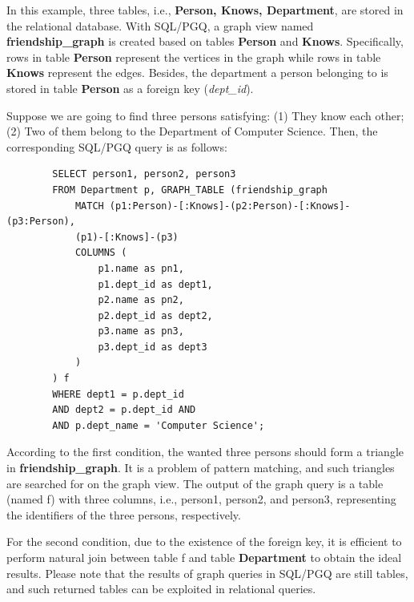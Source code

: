 \begin{example}
    \label{example:introduction:sqlpgq}
    In this example, three tables, i.e., \textbf{Person, Knows, Department}, are stored in the relational database.
    With SQL/PGQ, a graph view named \textbf{friendship\_graph} is created based on tables \textbf{Person} and \textbf{Knows}.
    Specifically, rows in table \textbf{Person} represent the vertices in the graph while rows in table \textbf{Knows} represent the edges.
    Besides, the department a person belonging to is stored in table \textbf{Person} as a foreign key (\textit{dept\_id}).

    Suppose we are going to find three persons satisfying: (1) They know each other; (2) Two of them belong to the Department of Computer Science.
    Then, the corresponding SQL/PGQ query is as follows:
    \begin{lstlisting}
        SELECT person1, person2, person3
        FROM Department p, GRAPH_TABLE (friendship_graph
            MATCH (p1:Person)-[:Knows]-(p2:Person)-[:Knows]-(p3:Person),
            (p1)-[:Knows]-(p3)
            COLUMNS (
                p1.name as pn1,
                p1.dept_id as dept1,
                p2.name as pn2,
                p2.dept_id as dept2,
                p3.name as pn3,
                p3.dept_id as dept3
            )
        ) f
        WHERE dept1 = p.dept_id
        AND dept2 = p.dept_id AND
        AND p.dept_name = 'Computer Science';
    \end{lstlisting}
    According to the first condition, the wanted three persons should form a triangle in \textbf{friendship\_graph}.
    It is a problem of pattern matching, and such triangles are searched for on the graph view.
    The output of the graph query is a table (named f) with three columns, i.e., person1, person2, and person3, representing the identifiers of the three persons, respectively.

    For the second condition, due to the existence of the foreign key, it is efficient to perform natural join between table f and table \textbf{Department} to obtain the ideal results.
    Please note that the results of graph queries in SQL/PGQ are still tables, and such returned tables can be exploited in relational queries.
\end{example}



